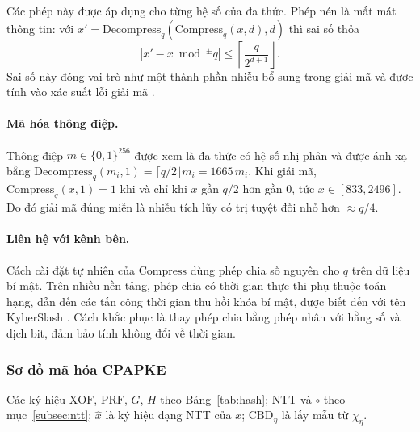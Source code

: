 \documentclass[../LuanVan.tex]{subfiles}
\begin{document}
Các phép này được áp dụng cho từng hệ số của đa thức. Phép nén là mất mát thông tin: với $x'=\mathrm{Decompress}_q(\mathrm{Compress}_q(x,d),d)$ thì sai số thỏa
\begin{equation}
    |x'-x \bmod^{\pm} q| \le \left\lceil \frac{q}{2^{d+1}}\right\rfloor .
\end{equation}
Sai số này đóng vai trò như một thành phần nhiễu bổ sung trong giải mã và được tính vào xác suất lỗi giải mã \cite{Bos18,Avanzi21}.

\paragraph{Mã hóa thông điệp.} Thông điệp $m\in\{0,1\}^{256}$ được xem là đa thức có hệ số nhị phân và được ánh xạ bằng $\mathrm{Decompress}_q(m_i,1)=\lceil q/2\rfloor m_i = 1665\, m_i$. Khi giải mã, $\mathrm{Compress}_q(x,1)=1$ khi và chỉ khi $x$ gần $q/2$ hơn gần $0$, tức $x\in[833,2496]$. Do đó giải mã đúng miễn là nhiễu tích lũy có trị tuyệt đối nhỏ hơn $\approx q/4$.

\paragraph{Liên hệ với kênh bên.} Cách cài đặt tự nhiên của $\mathrm{Compress}$ dùng phép chia số nguyên cho $q$ trên dữ liệu bí mật. Trên nhiều nền tảng, phép chia có thời gian thực thi phụ thuộc toán hạng, dẫn đến các tấn công thời gian thu hồi khóa bí mật, được biết đến với tên KyberSlash \cite{KyberSlash24}. Cách khắc phục là thay phép chia bằng phép nhân với hằng số và dịch bit, đảm bảo tính không đổi về thời gian.

\subsubsection{Sơ đồ mã hóa CPAPKE}\label{subsec:cpapke}

Các ký hiệu $\mathrm{XOF}$, $\mathrm{PRF}$, $G$, $H$ theo Bảng~\ref{tab:hash}; $\mathrm{NTT}$ và $\circ$ theo mục~\ref{subsec:ntt}; $\hat{x}$ là ký hiệu dạng NTT của $x$; $\mathrm{CBD}_\eta$ là lấy mẫu từ $\chi_\eta$.
\end{document}

